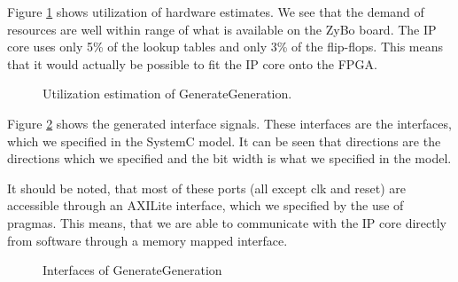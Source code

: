 Figure \ref{fig:ggutilizationestimates} shows utilization of hardware estimates. We see that the demand of resources are well within range of what is available on the ZyBo board. The IP core uses only 5\% of the lookup tables and only 3\% of the flip-flops. This means that it would actually be possible to fit the IP core onto the FPGA.
\FloatBarrier

\begin{figure}[h!]
	\centering
	\caption{Utilization estimation of GenerateGeneration.}
	\label{fig:ggutilizationestimates}
\end{figure}
\FloatBarrier

Figure \ref{fig:gginterface} shows the generated interface signals. These interfaces are the interfaces, which we specified in the SystemC model. It can be seen that directions are the directions which we specified and the bit width is what we specified in the model.

It should be noted, that most of these ports (all except clk and reset) are accessible through an AXILite interface, which we specified by the use of pragmas. This means, that we are able to communicate with the IP core directly from software through a memory mapped interface.

\begin{figure}[h!]
	\centering
	\caption{Interfaces of GenerateGeneration}
	\label{fig:gginterface}
\end{figure}


